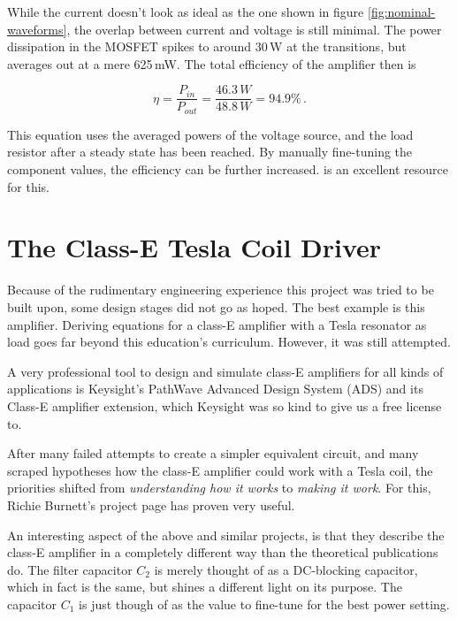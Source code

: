 While the current doesn't look as ideal as the one shown in figure \ref{fig:nominal-waveforms}, the overlap between current and voltage is still minimal. The power dissipation in the MOSFET spikes to around 30\,W at the transitions, but averages out at a mere 625\,mW. The total efficiency of the amplifier then is

\begin{equation}
    \eta = \frac{P_{in}}{P_{out}} = \frac{46.3\,W}{48.8\,W} = 94.9\%\,.
\end{equation}

This equation uses the averaged powers of the voltage source, and the load resistor after a steady state has been reached. By manually fine-tuning the component values, the efficiency can be further increased. 
is an excellent resource for this.

\section{The Class-E Tesla Coil Driver}

Because of the rudimentary engineering experience this project was tried to be built upon, some design stages did not go as hoped. The best example is this amplifier. Deriving equations for a class-E amplifier with a Tesla resonator as load goes far beyond this education's curriculum. However, it was still attempted.

A very professional tool to design and simulate class-E amplifiers for all kinds of applications is Keysight's PathWave Advanced Design System (ADS) and its Class-E amplifier extension, which Keysight was so kind to give us a free license to. %

After many failed attempts to create a simpler equivalent circuit, and many scraped hypotheses how the class-E amplifier could work with a Tesla coil, the priorities shifted from \emph{understanding how it works} to \emph{making it work}. For this, Richie Burnett's project page has proven very useful.

An interesting aspect of the above and similar projects, is that they describe the class-E amplifier in a completely different way than the theoretical publications do. The filter capacitor \(C_2\) is merely thought of as a DC-blocking capacitor, which in fact is the same, but shines a different light on its purpose. The capacitor \(C_1\) is just though of as the value to fine-tune for the best power setting.

